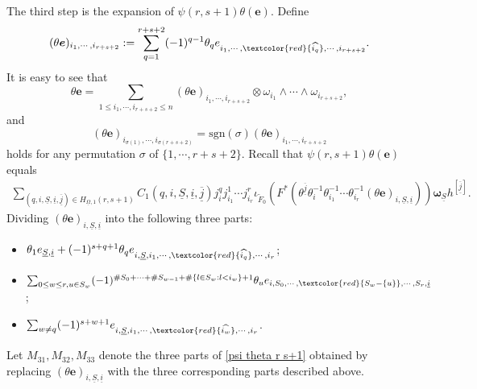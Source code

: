 \documentclass[12pt, a4paper]{article}
\begin{document}
The third step is the expansion of $\psi(r,s+1)\theta(\boldsymbol{e})$. Define
$$
(\theta\boldsymbol{e})_{i_1,\cdots,i_{r+s+2}}:=\sum_{q=1}^{r+s+2}(-1)^{q-1}\theta_qe_{i_1,\cdots,\textcolor{red}{\widehat{i_q}},\cdots,i_{r+s+2}}.
$$
It is easy to see that
$$
\theta\boldsymbol{e}=\sum_{1\leq i_1,\cdots,i_{r+s+2}\leq n}(\theta\boldsymbol{e})_{i_1,\cdots,i_{r+s+2}}\otimes\omega_{i_1}\wedge\cdots\wedge\omega_{i_{r+s+2}},
$$
and $$(\theta\boldsymbol{e})_{i_{\sigma(1)},\cdots,i_{\sigma(r+s+2)}}=\mathrm{sgn}(\sigma)(\theta\boldsymbol{e})_{i_1,\cdots,i_{r+s+2}}$$ holds for any permutation $\sigma$ of $\{1,\cdots,r+s+2\}$. Recall that $\psi(r,s+1)\theta(\boldsymbol{e})$ equals 
\begin{eqnarray}\label{psi theta r s+1}
\sum_{(q,i,\underline S,\underline i,\underline{\overline j})\in H_{\underline\Omega,1}(r,s+1)} C_1(q,i,\underline S,\underline i,\underline{\overline j})j^q_ij^1_{i_1}\cdots j^r_{i_r}\iota_{\tilde F_0}(F^*(\theta^{\underline{\overline j}}\theta_i^{-1}\theta_{i_1}^{-1}\cdots\theta_{i_r}^{-1}(\theta\boldsymbol{e})_{i,\underline S,\underline i}))\boldsymbol{\omega}_{\underline S}h^{[\underline{\overline j}]}.
\end{eqnarray}
Dividing $(\theta\boldsymbol{e})_{i,\underline S,\underline i}$ into the following three parts:
\begin{itemize}
    \item $\theta_1e_{\underline S,\underline i}+(-1)^{s+q+1}\theta_qe_{i,\underline S,i_1,\cdots,\textcolor{red}{\widehat{i_q}},\cdots,i_r}$;
    \item $\sum_{0\leq w\leq r,u\in S_w}(-1)^{\#S_0+\cdots+\#S_{w-1}+\#\{l\in S_w:l<i_w\}+1}\theta_ue_{i,S_0,\cdots,\textcolor{red}{S_w-\{u\}},\cdots,S_r,\underline i}$;
    \item $\sum_{w\neq q}(-1)^{s+w+1}e_{i,\underline S,i_1,\cdots,\textcolor{red}{\widehat{i_w}},\cdots,i_r}$.
\end{itemize}
Let \( M_{31}, M_{32}, M_{33} \) denote the three parts of \eqref{psi theta r s+1} obtained by replacing \( (\theta\boldsymbol{e})_{i,\underline{S},\underline{i}} \) with the three corresponding parts described above.
\end{document}
